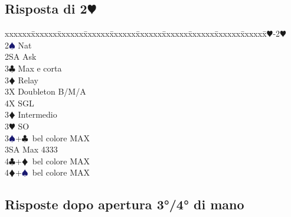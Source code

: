 \documentclass[a4paper,italian]{article}
\newcommand{\BC}{\textcolor{OliveGreen}{$\clubsuit$}}
\newcommand{\BD}{\textcolor{RedOrange}{$\vardiamondsuit$}}
\newcommand{\BH}{\textcolor{Red2}{$\varheartsuit${}}}
\newcommand{\BS}{\textcolor{MidnightBlue}{$\spadesuit${}}}
\newcommand{\pdfh}{\texorpdfstring{\BH{}}{H}}
\newenvironment{bidtable}
{\begin{tabbing}

    xxxxxx\=xxxxxx\=xxxxxx\=xxxxxx\=xxxxxx\=xxxxxx\=xxxxxx\=xxxxxx\=xxxxxx\=xxxxxx\=\kill}
{\end{tabbing} }%
\begin{document}
\begin{multicols}{2}
    \subsection{Risposta di 2\pdfh}

    \begin{bidtable}
        1\BH-2\BH\+\\
        2\BS \> Nat\\
        2SA \> Ask\+\\
        3\BC \> Max e corta\+\\
        3\BD \> Relay\+\\
        3X \> Doubleton B/M/A\\
        4X \> SGL\-\-\\
        3\BD \> Intermedio\\
        3\BH \> SO\\
        3\BS {}+\BC\ bel colore MAX\\
        3SA \> Max 4333\\
        4\BC {}+\BD\ bel colore MAX\\
        4\BD {}+\BS\ bel colore MAX\-\-
    \end{bidtable}
    \columnbreak

    \subsection{Risposte dopo apertura 3°/4° di mano}


\end{multicols}
\end{document}

